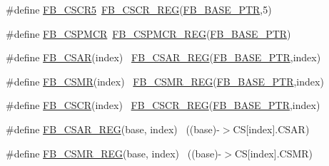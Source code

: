 \begin{DoxyCompactItemize}
\item 
\#define \hyperlink{group___f_b___register___accessor___macros_gad2feac4ee9e7a92e473f726b0cecfd1a}{F\+B\+\_\+\+C\+S\+C\+R5}~\hyperlink{group___f_b___register___accessor___macros_ga103c332d2bf6b4de271753e3599d60de}{F\+B\+\_\+\+C\+S\+C\+R\+\_\+\+R\+EG}(\hyperlink{group___f_b___peripheral_gace69013248279ed94480b3d6f6aa9fa6}{F\+B\+\_\+\+B\+A\+S\+E\+\_\+\+P\+TR},5)
\item 
\#define \hyperlink{group___f_b___register___accessor___macros_gacdb4ae53131e76a6096a02f481365ab7}{F\+B\+\_\+\+C\+S\+P\+M\+CR}~\hyperlink{group___f_b___register___accessor___macros_ga6fe638cb9de1da832ed97ec78038e98f}{F\+B\+\_\+\+C\+S\+P\+M\+C\+R\+\_\+\+R\+EG}(\hyperlink{group___f_b___peripheral_gace69013248279ed94480b3d6f6aa9fa6}{F\+B\+\_\+\+B\+A\+S\+E\+\_\+\+P\+TR})
\item 
\#define \hyperlink{group___f_b___register___accessor___macros_gad14bade8cd71144a1ab53db91b835881}{F\+B\+\_\+\+C\+S\+AR}(index)                                                  ~\hyperlink{group___f_b___register___accessor___macros_gab4eabed8c463260d1811c99bf92b8aaa}{F\+B\+\_\+\+C\+S\+A\+R\+\_\+\+R\+EG}(\hyperlink{group___f_b___peripheral_gace69013248279ed94480b3d6f6aa9fa6}{F\+B\+\_\+\+B\+A\+S\+E\+\_\+\+P\+TR},index)
\item 
\#define \hyperlink{group___f_b___register___accessor___macros_gac0956d3859461d739b757ff31f57ae5c}{F\+B\+\_\+\+C\+S\+MR}(index)                                                  ~\hyperlink{group___f_b___register___accessor___macros_gab85f399c0321b8598ed28acbb356e966}{F\+B\+\_\+\+C\+S\+M\+R\+\_\+\+R\+EG}(\hyperlink{group___f_b___peripheral_gace69013248279ed94480b3d6f6aa9fa6}{F\+B\+\_\+\+B\+A\+S\+E\+\_\+\+P\+TR},index)
\item 
\#define \hyperlink{group___f_b___register___accessor___macros_ga60f6318bba071640865153af2fe7fb33}{F\+B\+\_\+\+C\+S\+CR}(index)                                                  ~\hyperlink{group___f_b___register___accessor___macros_ga103c332d2bf6b4de271753e3599d60de}{F\+B\+\_\+\+C\+S\+C\+R\+\_\+\+R\+EG}(\hyperlink{group___f_b___peripheral_gace69013248279ed94480b3d6f6aa9fa6}{F\+B\+\_\+\+B\+A\+S\+E\+\_\+\+P\+TR},index)
\item 
\#define \hyperlink{group___f_b___register___accessor___macros_gab4eabed8c463260d1811c99bf92b8aaa}{F\+B\+\_\+\+C\+S\+A\+R\+\_\+\+R\+EG}(base,  index)                                ~((base)-\/$>$CS\mbox{[}index\mbox{]}.C\+S\+AR)
\item 
\#define \hyperlink{group___f_b___register___accessor___macros_gab85f399c0321b8598ed28acbb356e966}{F\+B\+\_\+\+C\+S\+M\+R\+\_\+\+R\+EG}(base,  index)                                ~((base)-\/$>$CS\mbox{[}index\mbox{]}.C\+S\+MR)

\end{DoxyCompactItemize}
